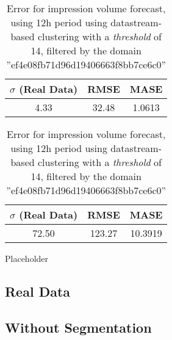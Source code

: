 \begin{table}[!ht]
\centering
\footnotesize
\begin{minipage}[t]{0.45\linewidth}
\centering
\footnotesize
\begin{tabular}{ccc}
 $\sigma$ (Real Data) & RMSE & MASE   \\ \hline
4.33 & 32.48 & 1.0613 \\
\end{tabular}

\vspace{0.5cm}

\caption[Error Volume
impression forecast, datastream, filtered]{Error for impression volume
forecast, using 12h period using datastream-based clustering with a
\emph{threshold} of 14}
\label{tab:err_domain_w_datastream}


\end{minipage}
\quad
\begin{minipage}[t]{0.45\linewidth}
\centering
\footnotesize
\begin{tabular}{ccc}
 $\sigma$ (Real Data) & RMSE & MASE   \\ \hline
72.50 & 123.27 & 10.3919 \\
\end{tabular}

\vspace{0.5cm}

\caption[Error Volume
impression forecast, domain, filtered]{Error for impression volume
forecast, using 12h period using datastream-based clustering with a
\emph{threshold} of 14, filtered by the domain ''ef4e08fb71d96d19406663f8bb7ce6c0'' }
\label{tab:err_domain_w_segmentation_datastream_filtered}


\end{minipage}

\end{table}


Placeholder



\subsection{Real Data}

\subsection*{Without Segmentation}

